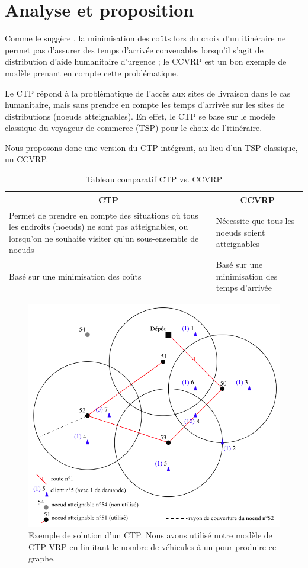 \documentclass[12pt, a4paper, onecolumn, twoside,french,cleardoublepage=plain,openany]{article}
\begin{document}
\section{Analyse et proposition}

Comme le suggère \cite{campbell_routing_2008}, la minimisation des coûts lors du choix d’un itinéraire ne permet pas d’assurer des temps d’arrivée convenables lorsqu’il s’agit de distribution d’aide humanitaire d’urgence ; le CCVRP est un bon exemple de modèle prenant en compte cette problématique.

Le CTP répond à la problématique de l’accès aux sites de livraison dans le cas humanitaire, mais sans prendre en compte les temps d’arrivée sur les sites de distributions (noeuds atteignables). En effet, le CTP se base sur le modèle classique du voyageur de commerce (TSP) pour le choix de l’itinéraire.

Nous proposons donc une version du CTP intégrant, au lieu d’un TSP classique, un CCVRP.

\begin{table}[h] \centering \begin{tabular}{@{}ll@{}} \toprule
\multicolumn{1}{c}{CTP} & \multicolumn{1}{c}{CCVRP} \\ \midrule
Permet de prendre en compte des situations où tous les endroits (noeuds) ne sont pas atteignables, ou lorsqu'on ne souhaite visiter qu'un sous-ensemble de noeuds & Nécessite que tous les noeuds soient atteignables \\
Basé sur une minimisation des coûts & Basé sur une minimisation des temps d'arrivée \\ \bottomrule
\end{tabular} \caption{Tableau comparatif CTP vs. CCVRP} \label{comparatif}
\end{table}

\begin{figure}[H] \centering
	\includegraphics[width=0.999\textwidth]{figures/ctp_sans_vrp}
	\caption[]{Exemple de solution d'un CTP. Nous avons utilisé notre modèle de CTP-VRP en limitant le nombre de véhicules à un pour produire ce graphe.} \label{fig_ctp_sans_vrp} 
\end{figure}
\end{document}
